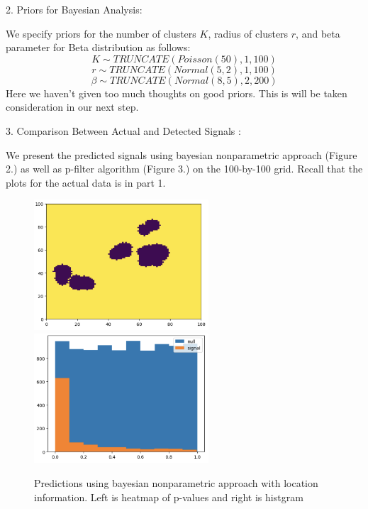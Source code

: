 \documentclass[12pt]{article}
\begin{document}
\vspace{1em}
2. Priors for Bayesian Analysis: 

We specify priors for the number of clusters $K$, radius of clusters $r$, and beta parameter for Beta distribution as follows: \\
$$K \sim TRUNCATE ( Poisson(50), 1, 100 )$$
$$r \sim TRUNCATE ( Normal(5, 2), 1, 100 )$$
$$\beta \sim TRUNCATE ( Normal(8, 5), 2, 200 )$$
Here we haven't given too much thoughts on good priors. This is will be taken consideration in our next step.

\vspace{1em}
3. Comparison Between Actual and Detected Signals : 

We present the predicted signals using bayesian nonparametric approach (Figure 2.) as well as p-filter algorithm (Figure 3.) on the 100-by-100 grid. Recall that the plots for the actual data is in part 1.
\begin{figure}[h]
\caption{Predictions using bayesian nonparametric approach with location information. Left is heatmap of p-values and right is histgram}
\includegraphics[width=6.5cm]{baygrid}
\includegraphics[width=6.5cm]{bayhist}
\end{figure}
\end{document}
